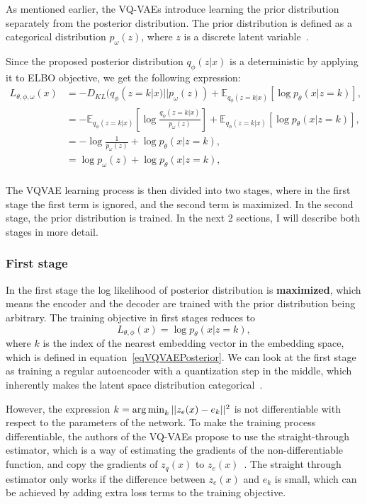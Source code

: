 As mentioned earlier, the VQ-VAEs introduce learning the prior distribution separately from the posterior distribution. The prior distribution is defined as a categorical distribution $p_{\omega}(z)$, where $z$ is a discrete latent variable~\cite{vqvae}.

Since the proposed posterior distribution $q_{\phi}(z|x)$ is a deterministic by applying it to ELBO objective, we get the following expression:
\begin{equation}
    \begin{split}
        L_{\theta, \phi, \omega}(x) &= - D_{KL}(q_{\phi}(z = k|x) || p_{\omega}(z)) + \mathbb{E}_{q_{\phi}(z=k|x)} [\log p_{\theta}(x|z = k)],\\
                            &= - \mathbb{E}_{q_{\phi}(z=k|x)} [\log \frac{q_{\phi}(z=k|x)}{p_{\omega}(z)}] + \mathbb{E}_{q_{\phi}(z=k|x)} [\log p_{\theta}(x|z = k)],\\
                            &= - \log \frac{1}{p_{\omega}(z)} + \log p_{\theta}(x|z = k),\\
                            &= \log p_{\omega}(z) + \log p_{\theta}(x|z = k),\\
    \end{split}
\end{equation}

The VQVAE learning process is then divided into two stages, where in the first stage the first term is ignored, and the second term is maximized. In the second stage, the prior distribution is trained. In the next 2 sections, I will describe both stages in more detail.

\subsubsection{First stage}

In the first stage the log likelihood of posterior distribution is \textbf{maximized}, which means the encoder and the decoder are trained with the prior distribution being arbitrary. The training objective in first stages reduces to 
\[ L_{\theta, \phi}(x) = \log p_{\theta}(x|z = k), \]
where $k$ is the index of the nearest embedding vector in the embedding space, which is defined in equation~\ref{eqVQVAEPosterior}. We can look at the first stage as training a regular autoencoder with a quantization step in the middle, which inherently makes the latent space distribution categorical~\cite{vqvae}.
    
However, the expression $k = \operatorname*{arg\,min}_{k} || z_e(x) - e_k ||^2$ is not differentiable with respect to the parameters of the network. To make the training process differentiable, the authors of the VQ-VAEs propose to use the straight-through estimator, which is a way of estimating the gradients of the non-differentiable function, and copy the gradients of $z_q(x)$ to $z_e(x)$~\cite{vqvae}. The straight through estimator only works if the difference between $z_e(x)$ and $e_k$ is small, which can be achieved by adding extra loss terms to the training objective.~\cite{straight_through}


